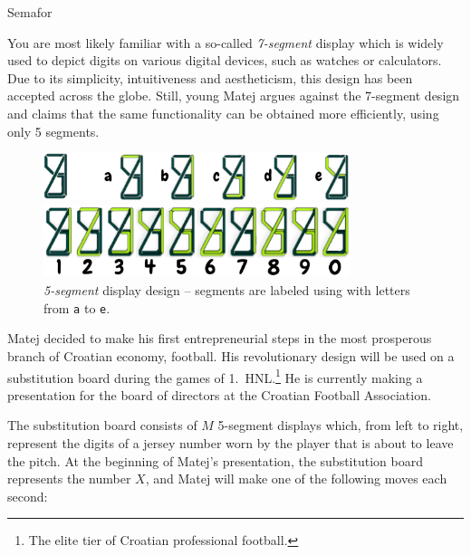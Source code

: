 \begin{statement}[
  problempoints=100,
  timelimit=4 seconds,
  memorylimit=512 MiB,
]{Semafor}

You are most likely familiar with a so-called \textit{7-segment} display which
is widely used to depict digits on various digital devices, such as watches or
calculators. Due to its simplicity, intuitiveness and aestheticism, this design
has been accepted across the globe. Still, young Matej argues against the
7-segment design and claims that the same functionality can be obtained
more efficiently, using only 5 segments.

\begin{figure}[H]
  \begin{center}
    \includegraphics[width=0.8\textwidth]{img/5segment.png}

    \vspace{0.5cm}

    \includegraphics[width=0.8\textwidth]{img/5segmentdigits.png}
    \caption*{\textit{5-segment} display design -- segments are labeled using
              with letters from \texttt{a} to \texttt{e}.}
  \end{center}
\end{figure}
  \vspace{-0.7cm}
Matej decided to make his first entrepreneurial steps in the most prosperous
branch of Croatian economy, football. His revolutionary design will be used
on a substitution board during the games of 1.\ HNL.\footnote{The elite tier
of Croatian professional football.} He is currently making a presentation for
the board of directors at the Croatian Football Association.

The substitution board consists of $M$ 5-segment displays which, from left to
right, represent the digits of a jersey number worn by the player that is about
to leave the pitch. At the beginning of Matej's presentation, the substitution
board represents the number $X$, and Matej will make one of the following moves
each second:


\end{statement}
